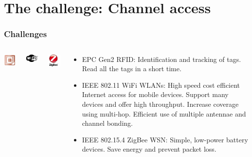 \documentclass{beamer}
\begin{document}
\section{The challenge: Channel access}
\begin{frame}
  \frametitle{Challenges}
  \begin{columns}[t]
      \begin{center}
        \includegraphics[width=1.0in]{figures/rfid}
      \end{center}
      \begin{center}
        \includegraphics[width=1.0in]{figures/wifi}
      \end{center}
      \begin{center}
        \includegraphics[width=1.0in]{figures/zigbee}
      \end{center}
      \begin{block}{}
        \begin{itemize}
          \item EPC Gen2 RFID: Identification and tracking of tags. Read all the tags in a short time.
          \item IEEE 802.11 WiFi WLANs: High speed cost efficient Internet access for mobile devices. Support many devices and offer high throughput. Increase coverage using multi-hop. Efficient use of multiple antennae and channel bonding.
          \item IEEE 802.15.4 ZigBee WSN: Simple, low-power battery devices. Save energy and prevent packet loss.
        \end{itemize}
      \end{block}
  \end{columns}
\end{frame}
\end{document}
